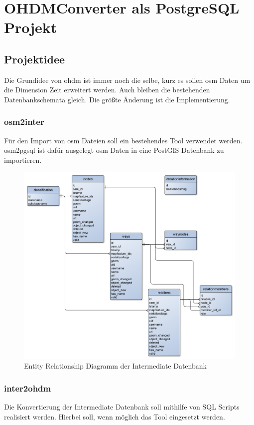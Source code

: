 \part{OHDMConverter als PostgreSQL Projekt}
\chapter{Projektidee}
Die Grundidee von \gls{ohdm} ist immer noch die selbe, kurz es sollen \gls{osm} Daten um die Dimension Zeit erweitert werden. Auch bleiben die bestehenden Datenbankschemata gleich. Die größte Änderung ist die Implementierung.

\section{osm2inter}
Für den Import von \gls{osm} Dateien soll ein bestehendes Tool \cite{osm2pgsql} verwendet werden. osm2pgsql\cite{osm2pgsql} ist dafür ausgelegt \gls{osm} Daten in eine PostGIS Datenbank zu importieren.

\begin{figure}[h]
	\caption{Entity Relationship Diagramm der Intermediate Datenbank}
	\label{fig:erd-inter}
	\includegraphics[width=\linewidth]{img/intermediate-db-erd.pdf}
\end{figure}

\section{inter2ohdm}
Die Konvertierung der Intermediate Datenbank soll mithilfe von SQL Scripts realisiert werden. Hierbei soll, wenn möglich das Tool \cite{postgres-psql} eingesetzt werden.


